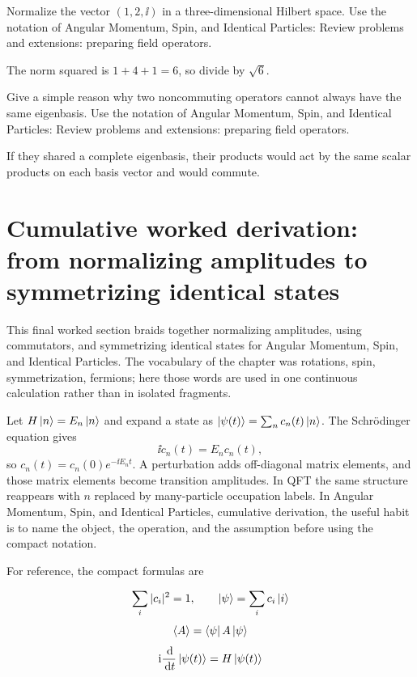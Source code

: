 \begin{exercise}
Normalize the vector \((1,2,\ii)\) in a three-dimensional Hilbert space.  Use the notation of Angular Momentum, Spin, and Identical Particles: Review problems and extensions: preparing field operators.
\begin{answer}
The norm squared is \(1+4+1=6\), so divide by \(\sqrt6\).
\end{answer}
\end{exercise}

\begin{exercise}
Give a simple reason why two noncommuting operators cannot always have the same eigenbasis.  Use the notation of Angular Momentum, Spin, and Identical Particles: Review problems and extensions: preparing field operators.
\begin{answer}
If they shared a complete eigenbasis, their products would act by the same scalar products on each basis vector and would commute.
\end{answer}
\end{exercise}



\section{Cumulative worked derivation: from normalizing amplitudes to symmetrizing identical states}

This final worked section braids together normalizing amplitudes, using commutators, and symmetrizing identical states for Angular Momentum, Spin, and Identical Particles.  The vocabulary of the chapter was rotations, spin, symmetrization, fermions; here those words are used in one continuous calculation rather than in isolated fragments.

Let \(H\left|n\right\rangle=E_n\left|n\right\rangle\) and expand a state as \(\left|\psi(t)\right\rangle=\sum_nc_n(t)\left|n\right\rangle\).  The Schrödinger equation gives
\[
  \ii\dot c_n(t)=E_nc_n(t),
\]
so \(c_n(t)=c_n(0)e^{-\ii E_nt}\).  A perturbation adds off-diagonal matrix elements, and those matrix elements become transition amplitudes.  In QFT the same structure reappears with \(n\) replaced by many-particle occupation labels.  In Angular Momentum, Spin, and Identical Particles, cumulative derivation, the useful habit is to name the object, the operation, and the assumption before using the compact notation.

For reference, the compact formulas are

\[
  \sum_i |c_i|^2=1,\qquad \left|\psi\right\rangle=\sum_i c_i\left|i\right\rangle
\]
\[
  \left\langle A\right\rangle=\left\langle \psi\right|A\left|\psi\right\rangle
\]
\[
  \mathrm i\frac{\,\mathrm d}{\,\mathrm d t}\left|\psi(t)\right\rangle=H\left|\psi(t)\right\rangle
\]

